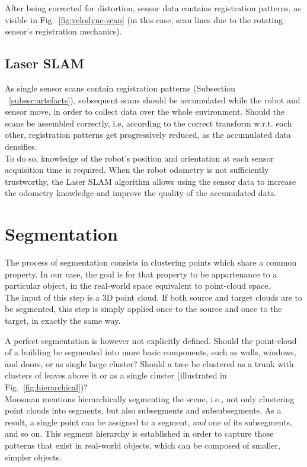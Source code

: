 After being corrected for distortion, sensor data contains registration patterns, as visible in Fig.~\ref{fig:velodyne-scan} (in this case, scan lines due to the rotating sensor's registration mechanics).

\subsection{Laser SLAM}
\label{subsec:SLAM}

As single sensor scans contain registration patterns (Subsection ~\ref{subsec:artefacts}), subsequent scans should be accumulated while the robot and sensor move, in order to collect data over the whole environment. Should the scans be assembled correctly, i.e, according to the correct transform w.r.t. each other, registration patterns get progressively reduced, as the accumulated data densifies.\\

To do so, knowledge of the robot's position and orientation at each sensor acquisition time is required. When the robot odometry is not sufficiently trustworthy, the Laser SLAM algorithm allows using the sensor data to increase the odometry knowledge and improve the quality of the accumulated data.\\

\section{Segmentation}
\label{sec:segmentation}

The process of segmentation consists in clustering points which share a common property. In our case, the goal is for that property to be appartenance to a particular object, in the real-world space equivalent to point-cloud space.\\

The input of this step is a 3D point cloud. If both source and target clouds are to be segmented, this step is simply applied once to the source and once to the target, in exactly the same way.

A perfect segmentation is however not explicitly defined. Should the point-cloud of a building be segmented into more basic components, such as walls, windows, and doors, or as single large cluster? Should a tree be clustered as a trunk with clusters of leaves above it or as a single cluster (illustrated in Fig.~\ref{fig:hierarchical})?\\

Moosman \cite{moosmann2011unsupervised} mentions hierarchically segmenting the scene, i.e., not only clustering point clouds into segments, but also subsegments and subsubsegments. As a result, a single point can be assigned to a segment, \textit{and} one of its subsegments, and so on. This segment hierarchy is established in order to capture those patterns that exist in real-world objects, which can be composed of smaller, simpler objects.\\


